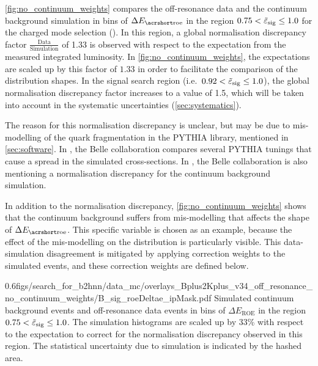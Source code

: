\cref{fig:no_continuum_weights} compares the off-resonance data and the continuum background simulation in bins of $\Delta E_{\mathrm{\ROE}}$ in the region $0.75<\tilde{\varepsilon}_{\mathrm{sig}}\le1.0$ for the charged mode selection (\BKpnn).
In this region, a global normalisation discrepancy factor $\mathrm{\frac{Data}{Simulation}}$ of 1.33 is observed with respect to the expectation from the measured integrated luminosity.
In \cref{fig:no_continuum_weights}, the expectations are scaled up by this factor of $1.33$ in order to facilitate the comparison of the distribution shapes.
In the signal search region (i.e.~$0.92<\tilde{\varepsilon}_{\mathrm{sig}}\le1.0$), the global normalisation discrepancy factor increases to a value of 1.5, which will be taken into account in the systematic uncertainties (\cref{sec:systematics}).

The reason for this normalisation discrepancy is unclear, but may be due to mis-modelling of the quark fragmentation in the PYTHIA library, mentioned in \cref{sec:software}.
In \cite{Belle:2020pvy}, the Belle collaboration compares several PYTHIA tunings that cause a spread in the simulated cross-sections.
In \cite{Belle:2017oht}, the Belle collaboration is also mentioning a normalisation discrepancy for the continuum background simulation.

In addition to the normalisation discrepancy, \cref{fig:no_continuum_weights} shows that the continuum background suffers from mis-modelling that affects the shape of $\Delta E_{\mathrm{\ROE}}$.
This specific variable is chosen as an example, because the effect of the mis-modelling on the distribution is particularly visible.
This data-simulation disagreement is mitigated by applying correction weights to the simulated events, and these correction weights are defined below.

{0.6}{figs/search_for_b2hnn/data_mc/overlays_Bplus2Kplus_v34_off_resonance_no_continuum_weights/B_sig_roeDeltae_ipMask.pdf}
{
Simulated continuum background events and off-resonance data events in bins of $\Delta E_{\mathrm{ROE}}$ in the region $0.75<\tilde{\varepsilon}_{\mathrm{sig}}\le1.0$.
The simulation histograms are scaled up by 33\% with respect to the expectation to correct for the normalisation discrepancy observed in this region.
The statistical uncertainty due to simulation is indicated by the hashed area.
}
